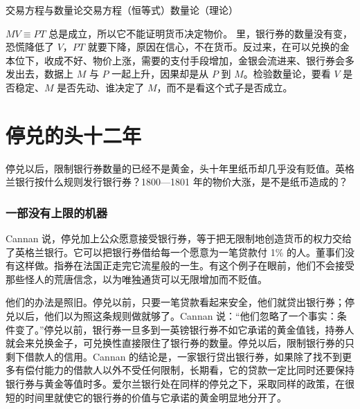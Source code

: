 \begin{compare}{交易方程与数量论}{交易方程（恒等式）}{数量论（理论）}
\end{compare}

\begin{pitfall}[交易方程证明了数量论]
$MV\equiv PT$ 总是成立，所以它不能证明货币决定物价。 里，银行券的数量没有变，恐慌降低了 $V$，$PT$ 就要下降，原因在信心，不在货币。反过来，在可以兑换的金本位下，收成不好、物价上涨，需要的支付手段增加，金银会流进来、银行券会多发出去，数据上 $M$ 与 $P$ 一起上升，因果却是从 $P$ 到 $M$。检验数量论，要看 $V$ 是否稳定、$M$ 是否先动、谁决定了 $M$，而不是看这个式子是否成立。
\end{pitfall}

\section{停兑的头十二年}\label{sec:bullion-restriction}

停兑以后，限制银行券数量的已经不是黄金，头十年里纸币却几乎没有贬值。英格兰银行按什么规则发行银行券？1800—1801 年的物价大涨，是不是纸币造成的？

\subsubsection{一部没有上限的机器}
Cannan 说，停兑加上公众愿意接受银行券，等于把无限制地创造货币的权力交给了英格兰银行。它可以把银行券借给每一个愿意为一笔贷款付 1\% 的人\cite{cannan1919}。董事们没有这样做。指券在法国正走完它流星般的一生。有这个例子在眼前，他们不会接受那些怪人的荒唐信念，以为唯独通货可以无限增加而不贬值\cite{cannan1919}。

他们的办法是照旧。停兑以前，只要一笔贷款看起来安全，他们就贷出银行券；停兑以后，他们以为照这条规则做就够了。Cannan 说：“他们忽略了一个事实：条件变了。”\cite{cannan1919}停兑以前，银行券一旦多到一英镑银行券不如它承诺的黄金值钱，持券人就会来兑换金子，可兑换性直接限住了银行券的数量。停兑以后，限制银行券的只剩下借款人的信用。Cannan 的结论是，一家银行贷出银行券，如果除了找不到更多有偿付能力的借款人以外不受任何限制，长期看，它的贷款一定比同时还要保持银行券与黄金等值时多\cite{cannan1919}。爱尔兰银行处在同样的停兑之下，采取同样的政策，在很短的时间里就使它的银行券的价值与它承诺的黄金明显地分开了\cite{cannan1919}。

